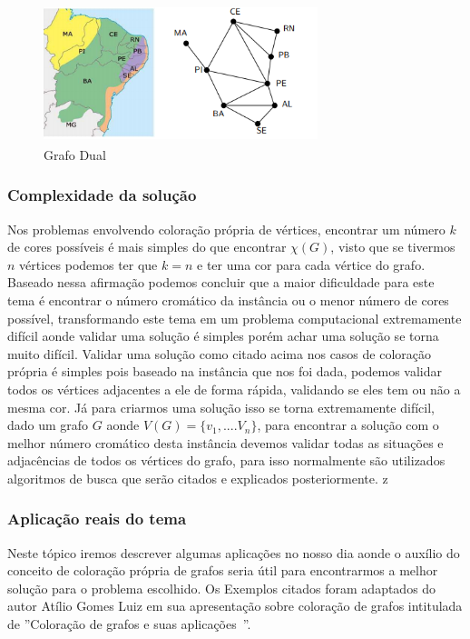 \documentclass[12pt]{article}
\begin{document}
	\begin{figure}[!htb]
		\centering
		 \includegraphics[width=8cm,height=4cm]{grafoDual}
		\caption{Grafo Dual}    
	\end{figure}

	
	\subsubsection{Complexidade da solução}
	
	Nos problemas envolvendo coloração própria de vértices, encontrar um número $k$ de cores possíveis é mais simples do que encontrar $\chi(G)$, visto que se tivermos $n$ vértices podemos ter que $k = n$ e ter uma cor para cada vértice do grafo. Baseado nessa afirmação podemos concluir que a maior dificuldade para este tema é encontrar o número cromático da instância ou o menor número de cores possível, transformando este tema em um problema computacional extremamente difícil aonde validar uma solução é simples porém achar uma solução se torna muito difícil.
	Validar uma solução como citado acima nos casos de coloração própria é simples pois baseado na instância que nos foi dada, podemos validar todos os vértices adjacentes a ele de forma rápida, validando se eles tem ou não a mesma cor. Já para criarmos uma solução isso se torna extremamente difícil, dado um grafo $G$ aonde $V(G) = \{v_{1}, .... V_{n} \}$, para encontrar a solução com o melhor número cromático desta instância devemos validar todas as situações e adjacências de todos os vértices do grafo, para isso normalmente são utilizados algoritmos de busca que serão citados e explicados posteriormente.
	z
	\subsubsection{Aplicação reais do tema}
	
	Neste tópico iremos descrever algumas aplicações no nosso dia aonde o auxílio do conceito de coloração própria de grafos seria útil para encontrarmos a melhor solução para o problema escolhido. Os Exemplos citados foram adaptados do autor Atílio Gomes Luiz em sua apresentação sobre coloração de grafos intitulada de  ''Coloração de grafos e suas aplicações~\cite{ColoracaoEAplicacoes}''.
\end{document}
